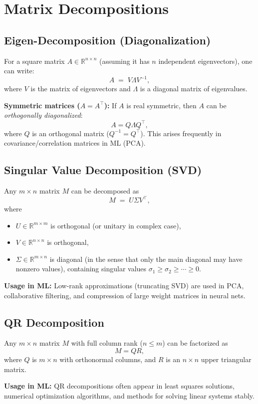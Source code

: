 \section{Matrix Decompositions}
\subsection{Eigen-Decomposition (Diagonalization)}
For a square matrix $A \in \mathbb{R}^{n \times n}$ (assuming it has $n$ independent eigenvectors), 
one can write:
\[
A \;=\; V \Lambda V^{-1},
\]
where $V$ is the matrix of eigenvectors and $\Lambda$ is a diagonal matrix of eigenvalues. 

\textbf{Symmetric matrices ($A = A^\top$):} 
If $A$ is real symmetric, then $A$ can be \emph{orthogonally diagonalized}:
\[
A = Q \Lambda Q^\top,
\]
where $Q$ is an orthogonal matrix ($Q^{-1} = Q^\top$). 
This arises frequently in covariance/correlation matrices in ML (PCA).

\subsection{Singular Value Decomposition (SVD)}
Any $m \times n$ matrix $M$ can be decomposed as
\[
M \;=\; U \Sigma V^\top,
\]
where
\begin{itemize}
    \item $U \in \mathbb{R}^{m \times m}$ is orthogonal (or unitary in complex case),
    \item $V \in \mathbb{R}^{n \times n}$ is orthogonal,
    \item $\Sigma \in \mathbb{R}^{m \times n}$ is diagonal (in the sense that only the main diagonal may have nonzero values), 
          containing singular values $\sigma_1 \ge \sigma_2 \ge \cdots \ge 0$.
\end{itemize}
\textbf{Usage in ML:}  
Low-rank approximations (truncating SVD) are used in PCA, collaborative filtering, 
and compression of large weight matrices in neural nets.

\subsection{QR Decomposition}
Any $m \times n$ matrix $M$ with full column rank ($n \le m$) can be factorized as
\[
M = Q R,
\]
where $Q$ is $m \times n$ with orthonormal columns, and $R$ is an $n \times n$ upper triangular matrix.

\textbf{Usage in ML:} 
QR decompositions often appear in least squares solutions, numerical optimization algorithms, 
and methods for solving linear systems stably.

